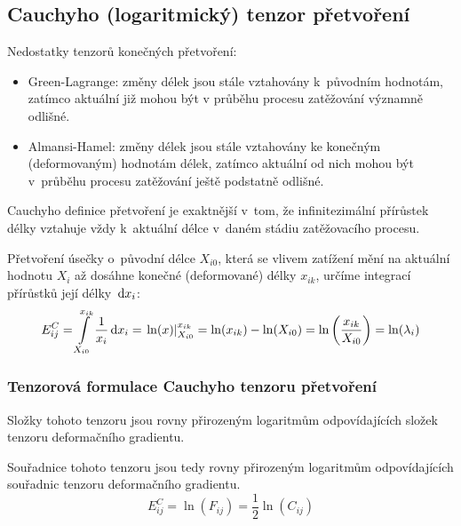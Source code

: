 
\subsection{Cauchyho (logaritmický) tenzor přetvoření}
Nedostatky tenzorů konečných přetvoření:
\begin{itemize}
	\item Green-Lagrange: změny délek jsou stále vztahovány k~původním hodnotám, zatímco aktuální již mohou být v průběhu procesu zatěžování významně odlišné.
	\item Almansi-Hamel: změny délek jsou stále vztahovány ke konečným (deformovaným) hodnotám délek, zatímco aktuální od nich mohou být v~průběhu procesu zatěžování ještě podstatně odlišné.
\end{itemize}

Cauchyho definice přetvoření je exaktnější v~tom, že infinitezimální přírůstek délky vztahuje vždy k~aktuální délce v~daném stádiu zatěžovacího procesu.

Přetvoření úsečky o~původní délce $X_{i0}$, která se vlivem zatížení mění na aktuální hodnotu $X_i$ až dosáhne konečné (deformované) délky $x_{ik}$, určíme integrací přírůstků její délky $\,\mathrm{d} x_i$:
\begin{equation}
	E^C_{ij}
	= \int\limits_{X_{i0}}^{x_{ik}} \frac{1}{x_i} \,\mathrm{d} x_i
	= \left. \ln(x) \right\rvert_{X_{i0}}^{x_{ik}}
	= \ln(x_{ik}) - \ln(X_{i0})
	= \ln\left(\frac{x_{ik}}{X_{i0}}\right)
	= \ln(\lambda_i)
\end{equation}

\subsubsection{Tenzorová formulace Cauchyho tenzoru přetvoření}

Složky tohoto tenzoru jsou rovny přirozeným logaritmům odpovídajících složek tenzoru deformačního gradientu.


Souřadnice tohoto tenzoru jsou tedy rovny přirozeným logaritmům odpovídajících souřadnic tenzoru deformačního gradientu.
\begin{equation}
	E^C_{ij} = \ln(F_{ij}) = \frac{1}{2} \ln(C_{ij})
\end{equation}

